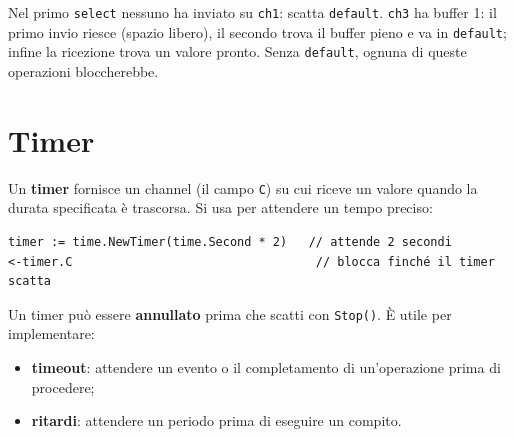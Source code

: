 \documentclass[11pt,a4paper]{report}
\newcommand{\cod}[1]{\texttt{#1}}
\begin{document}
Nel primo \cod{select} nessuno ha inviato su \cod{ch1}: scatta \cod{default}.
\cod{ch3} ha buffer 1: il primo invio riesce (spazio libero), il secondo trova il
buffer pieno e va in \cod{default}; infine la ricezione trova un valore
pronto. Senza \cod{default}, ognuna di queste operazioni bloccherebbe.

\section{Timer}\label{sec:timer}

Un \textbf{timer} fornisce un channel (il campo \cod{C}) su cui riceve un valore
quando la durata specificata è trascorsa. Si usa per attendere un tempo
preciso:

\begin{lstlisting}[style=gocode,numbers=none]
timer := time.NewTimer(time.Second * 2)   // attende 2 secondi
<-timer.C                                  // blocca finché il timer scatta
\end{lstlisting}

Un timer può essere \textbf{annullato} prima che scatti con \cod{Stop()}. È
utile per implementare:

\begin{itemize}
  \item \textbf{timeout}: attendere un evento o il completamento di
        un'operazione prima di procedere;
  \item \textbf{ritardi}: attendere un periodo prima di eseguire un compito.
\end{itemize}
\end{document}
